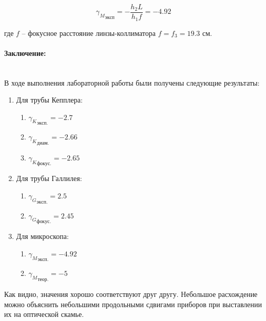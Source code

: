 \documentclass[a4paper, 12pt]{article}
\newcommand{\parag}[1]{\paragraph*{#1:}}
\begin{document}
\begin{equation*}
    {\gamma_M}_{эксп} = -\frac{h_2L}{h_1f} = -4.92
\end{equation*}

где $f$ -- фокусное расстояние линзы-коллиматора $ f = f_3 = 19.3 $ см.


\parag {Заключение} ~\\
В ходе выполнения лабораторной работы были получены следующие результаты:
\begin{enumerate}
    \item Для трубы Кепплера:
        \begin{enumerate}
            \item ${\gamma_K}_{эксп.} = -2.7$
            \item ${\gamma_{K}}_{диам.} = -2.66$
            \item ${\gamma_{K}}_{фокус.} = -2.65$
        \end{enumerate}
    \item Для трубы Галлилея:
            \begin{enumerate}
                \item ${\gamma_G}_{эксп.} = 2.5 $
                \item $ {\gamma_G}_{фокус.} = 2.45 $
            \end{enumerate}
    \item Для микроскопа:
        \begin{enumerate}
            \item ${\gamma_M}_{эксп.} = -4.92 $
            \item $ {\gamma_M}_{теор.} = -5 $
        \end{enumerate}
\end{enumerate}

Как видно, значения хорошо соответствуют друг другу. Небольшое расхождение можно объяснить небольшими продольными сдвигами приборов при выставлении их на оптической скамье. 
\end{document}
